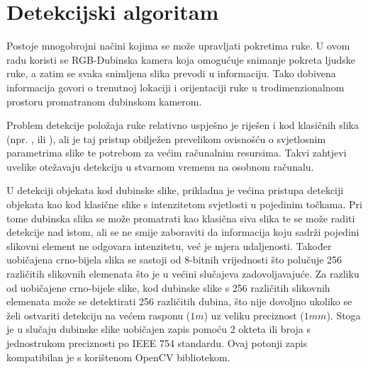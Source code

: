 \documentclass[times, utf8, diplomski, numeric]{fer}
\begin{document}
%
%

\chapter{Detekcijski algoritam}\label{Detekcijski algoritam}
Postoje mnogobrojni načini kojima se može upravljati pokretima ruke. U ovom radu koristi se RGB-Dubinska kamera koja omogućuje snimanje pokreta ljudske ruke, a zatim se svaka snimljena slika prevodi u informaciju. Tako dobivena informacija govori o trenutnoj lokaciji i orijentaciji ruke u trodimenzionalnom prostoru promatranom dubinskom kamerom.

Problem detekcije položaja ruke relativno uspješno je riješen i kod klasičnih slika (npr. \cite{de2011model}, \cite{stenger2001model} ili \cite{rehg1994visual}), ali je taj pristup obilježen prevelikom ovisnošću o svjetlosnim parametrima slike te potrebom za većim računalnim resursima. Takvi zahtjevi uvelike otežavaju detekciju u stvarnom vremenu na osobnom računalu.

U detekciji objekata kod dubinske slike, prikladna je većina pristupa detekciji objekata kao kod klasične slike s intenzitetom svjetlosti u pojedinim točkama. Pri tome dubinska slika se može promatrati kao klasična siva slika te se može raditi detekcije nad istom, ali se ne smije zaboraviti da informacija koju sadrži pojedini slikovni element ne odgovara intenzitetu, već je mjera udaljenosti. Također uobičajena crno-bijela slika se sastoji od 8-bitnih vrijednosti što polučuje 256 različitih slikovnih elemenata što je u većini slučajeva zadovoljavajuće. Za razliku od uobičajene crno-bijele slike, kod dubinske slike s 256 različitih slikovnih elemenata može se detektirati 256 različitih dubina, što nije dovoljno ukoliko se želi ostvariti detekciju na većem rasponu ($1m$) uz veliku preciznost ($1mm$). Stoga je u slučaju dubinske slike uobičajen zapis pomoću 2 okteta ili broja s jednostrukom preciznosti po IEEE 754 standardu. Ovaj potonji zapis kompatibilan je s korištenom OpenCV bibliotekom.
\end{document}
